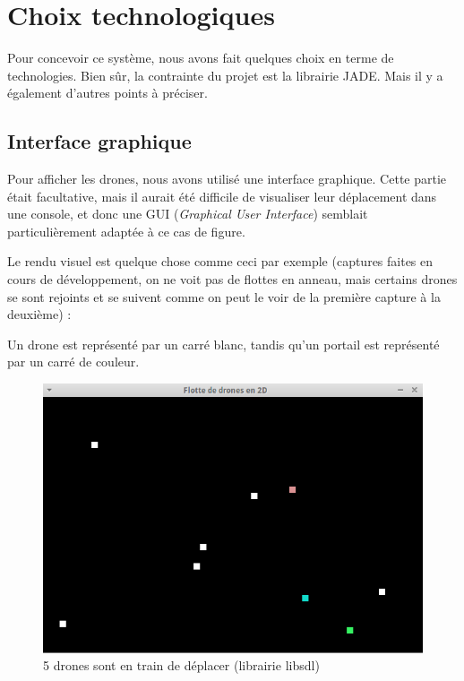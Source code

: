 \documentclass[11pt]{report}
\begin{document}
\section{Choix technologiques}

Pour concevoir ce système, nous avons fait quelques choix en terme de technologies. Bien sûr, la contrainte du projet est la librairie JADE. Mais il y a également d'autres points à préciser.

\subsection{Interface graphique}

Pour afficher les drones, nous avons utilisé une interface graphique. Cette partie était facultative, mais il aurait été difficile de visualiser leur déplacement dans une console, et donc une GUI (\textit{Graphical User Interface}) semblait particulièrement adaptée à ce cas de figure.

Le rendu visuel est quelque chose comme ceci par exemple (captures faites en cours de développement, on ne voit pas de flottes en anneau, mais certains drones se sont rejoints et se suivent comme on peut le voir de la première capture à la deuxième) :

Un drone est représenté par un carré blanc, tandis qu'un portail est représenté par un carré de couleur.

\begin{figure}[h]
\centering
\includegraphics[scale = 0.9]{img/flotte-3.png}
\caption{5 drones sont en train de déplacer (librairie libsdl)}
\end{figure}
\end{document}
